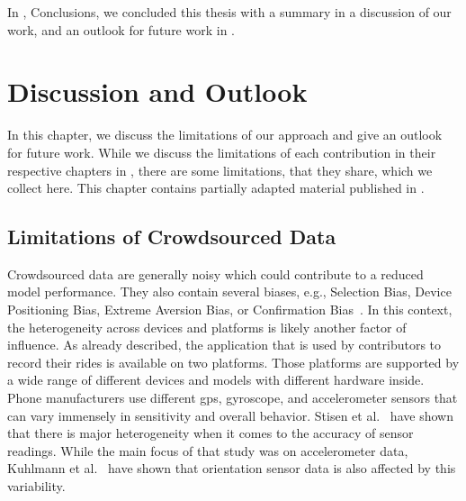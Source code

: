 In , Conclusions, we concluded this thesis with a summary in  a discussion of our work, and an outlook for future work in .
\chapter{Discussion and Outlook}
\label{cha:discussion_and_outlook}
In this chapter, we discuss the limitations of our approach and give an outlook for future work.
While we discuss the limitations of each contribution in their respective chapters in , there are some limitations, that they share, which we collect here.
This chapter contains partially adapted material published in \cite{karakaya2020simra,karakaya2022cyclesense,karakaya2022realistic,karakaya2023achieving,karakaya2023crowdsensing}.

\section{Limitations of Crowdsourced Data}
\label{sec:limitations_of_crowdsourced_data}
Crowdsourced data are generally noisy which could contribute to a reduced model performance.
They also contain several biases, e.g., Selection Bias, Device Positioning Bias, Extreme Aversion Bias, or Confirmation Bias~\cite{basiri2019crowdsourced, chakraborty2017makes, kahneman1991anomalies}.
In this context, the heterogeneity across devices and platforms is likely another factor of influence.
As already described, the application that is used by contributors to record their rides is available on two platforms. 
Those platforms are supported by a wide range of different devices and models with different hardware inside. 
Phone manufacturers use different \ac{gps}, gyroscope, and accelerometer sensors that can vary immensely in sensitivity and overall behavior.
Stisen et al.~\cite{stisen2015smart} have shown that there is major heterogeneity when it comes to the accuracy of sensor readings. 
While the main focus of that study was on accelerometer data, Kuhlmann et al.~\cite{kuhlmann2021smartphone} have shown that orientation sensor data is also affected by this variability.
